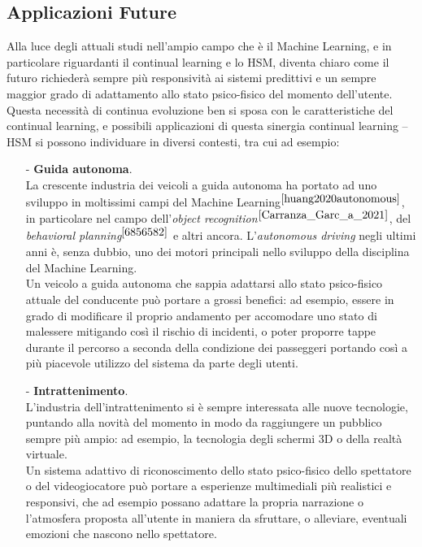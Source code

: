 \subsection{Applicazioni Future}
Alla luce degli attuali studi nell'ampio campo che è il Machine Learning, e in particolare riguardanti il continual learning e lo HSM, diventa chiaro come il futuro richiederà sempre più responsività ai sistemi predittivi e un sempre maggior grado di adattamento allo stato psico-fisico del momento dell'utente. Questa necessità di continua evoluzione ben si sposa con le caratteristiche del continual learning, e possibili applicazioni di questa sinergia continual learning -- HSM si possono individuare in diversi contesti, tra cui ad esempio:
\begin{itemize}
    \item[-] \textbf{Guida autonoma}.\\La crescente industria dei veicoli a guida autonoma ha portato ad uno sviluppo in moltissimi campi del Machine Learning$^{\cite{huang2020autonomous}}$, in particolare nel campo dell'\textit{object recognition}$^{\cite{Carranza_Garc_a_2021}}$, del \textit{behavioral planning}$^{\cite{6856582}}$ e altri ancora. L'\textit{autonomous driving} negli ultimi anni è, senza dubbio, uno dei motori principali nello sviluppo della disciplina del Machine Learning.\\
    Un veicolo a guida autonoma che sappia adattarsi allo stato psico-fisico attuale del conducente può portare a grossi benefici: ad esempio, essere in grado di modificare il proprio andamento per accomodare uno stato di malessere mitigando così il rischio di incidenti, o poter proporre tappe durante il percorso a seconda della condizione dei passeggeri portando così a più piacevole utilizzo del sistema da parte degli utenti.
    \item[-] \textbf{Intrattenimento}.\\L'industria dell'intrattenimento si è sempre interessata alle nuove tecnologie, puntando alla novità del momento in modo da raggiungere un pubblico sempre più ampio: ad esempio, la tecnologia degli schermi 3D o della realtà virtuale.\\
    Un sistema adattivo di riconoscimento dello stato psico-fisico dello spettatore o del videogiocatore può portare a esperienze multimediali più realistici e responsivi, che ad esempio possano adattare la propria narrazione o l'atmosfera proposta all'utente in maniera da sfruttare, o alleviare, eventuali emozioni che nascono nello spettatore.
\end{itemize}
